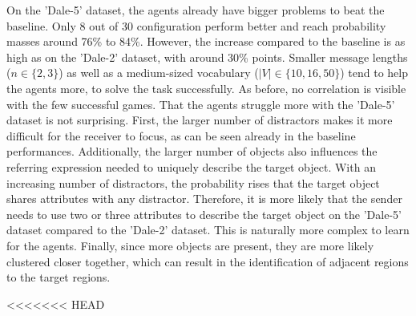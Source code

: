 \documentclass[11pt]{article}
\begin{document}
On the 'Dale-5' dataset, the agents already have bigger problems to beat the baseline.
Only 8 out of 30 configuration perform better and reach probability masses around 76\% to 84\%.
However, the increase compared to the baseline is as high as on the 'Dale-2' dataset, with around 30\% points.
Smaller message lengths ($n \in \{2,3\}$) as well as a medium-sized vocabulary ($|V| \in \{10,16,50\}$) tend to help the agents more, to solve the task successfully.
As before, no correlation is visible with the few successful games.
That the agents struggle more with the 'Dale-5' dataset is not surprising.
First, the larger number of distractors makes it more difficult for the receiver to focus, as can be seen already in the baseline performances.
Additionally, the larger number of objects also influences the referring expression needed to uniquely describe the target object.
With an increasing number of distractors, the probability rises that the target object shares attributes with any distractor.
Therefore, it is more likely that the sender needs to use two or three attributes to describe the target object on the 'Dale-5' dataset compared to the 'Dale-2' dataset.
This is naturally more complex to learn for the agents. %
Finally, since more objects are present, they are more likely clustered closer together, which can result in the identification of adjacent regions to the target regions.

<<<<<<< HEAD
\end{document}
